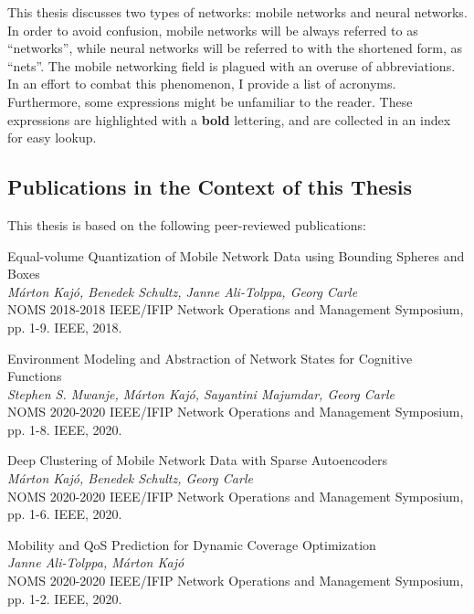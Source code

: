 			This thesis discusses two types of networks: mobile networks and neural networks.
			In order to avoid confusion, mobile networks will be always referred to as ``networks'', while neural networks will be referred to with the shortened form, as ``nets''.
			The mobile networking field is plagued with an overuse of abbreviations.
			In an effort to combat this phenomenon, I provide a list of acronyms.
			Furthermore, some expressions might be unfamiliar to the reader.
			These expressions are highlighted with a \textbf{bold} lettering, and are collected in an index for easy lookup.
		
		\vfill
			
		\subsection{Publications in the Context of this Thesis}
			
			This thesis is based on the following peer-reviewed publications:
			
			\begin{publication}
				Equal-volume Quantization of Mobile Network Data using Bounding Spheres and Boxes \\
				\textit{Márton Kajó, Benedek Schultz, Janne Ali-Tolppa, Georg Carle} \\
				NOMS 2018-2018 IEEE/IFIP Network Operations and Management Symposium, pp. 1-9. IEEE, 2018.
			\end{publication}
			
			\begin{publication}
				Environment Modeling and Abstraction of Network States for Cognitive Functions \\
				\textit{Stephen S. Mwanje, Márton Kajó, Sayantini Majumdar, Georg Carle} \\
				NOMS 2020-2020 IEEE/IFIP Network Operations and Management Symposium, pp. 1-8. IEEE, 2020.
			\end{publication}
			
			\begin{publication}
				Deep Clustering of Mobile Network Data with Sparse Autoencoders \\
				\textit{Márton Kajó, Benedek Schultz, Georg Carle} \\
				NOMS 2020-2020 IEEE/IFIP Network Operations and Management Symposium, pp. 1-6. IEEE, 2020.
			\end{publication}
			
			\begin{publication}
				Mobility and QoS Prediction for Dynamic Coverage Optimization \\
				\textit{Janne Ali-Tolppa, Márton Kajó} \\
				NOMS 2020-2020 IEEE/IFIP Network Operations and Management Symposium, pp. 1-2. IEEE, 2020.
			\end{publication}
			
